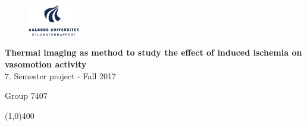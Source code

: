 \clearpage
\thispagestyle{empty}

\begin{figure}[H]
	\raggedleft
	\includegraphics[width=0.2\textwidth]{figures/aaulogo-da.png}
\end{figure} 

\vspace{5 cm}

\begin{center}	
	\begin{Huge}
		\textbf{Thermal imaging as method to study the effect of induced ischemia on vasomotion activity}\\
		\vspace{5 mm}
		$7.$ Semester project - Fall 2017\\
		\vspace{3 mm}
	\end{Huge}
	{\Large Group $7407$}
\end{center}
\vspace*{\fill}

\begin{center}
	\line(1,0){400}
\end{center}

